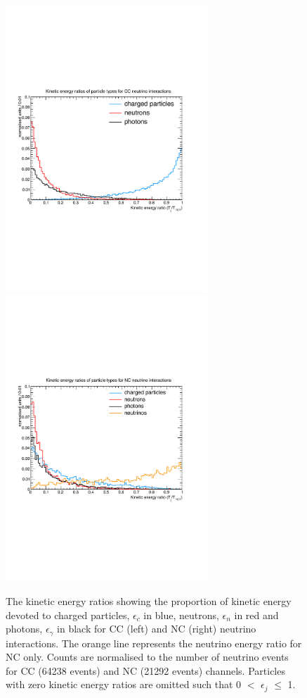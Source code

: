 \begin{figure}
\begin{center}
  	\includegraphics[width=76mm]{Chapter4/figures/cc_kinEnergy_ratio.pdf}
  	\includegraphics[width=76mm]{Chapter4/figures/nc_kinEnergy_ratio.pdf}
	\caption{The kinetic energy ratios showing the proportion of kinetic energy devoted to charged particles, $\epsilon_{c}$ in blue, neutrons, $\epsilon_{n}$ in red and photons, $\epsilon_{\gamma}$ in black for CC (left) and NC (right) neutrino interactions. The orange line represents the neutrino energy ratio for NC only. Counts are normalised to the number of neutrino events for CC (64238 events) and NC (21292 events) channels. Particles with zero kinetic energy ratios are omitted such that 0 $<$ $\epsilon_{j}$ $\leq$ 1.}
	\label{fig:CCandNCKinEnergyRatios}
\end{center}
\end{figure}


